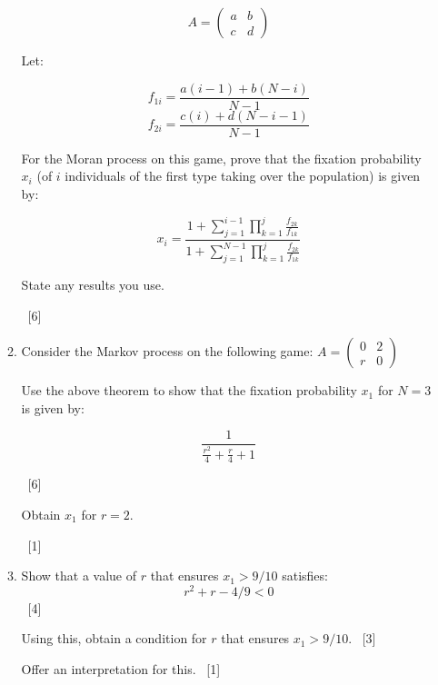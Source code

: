 \documentclass[12pt,a4paper]{article}
\makeatletter
\renewcommand{\@oddfoot}{\hfil \arabic{page} \hfil}    %
\makeatother
\begin{document}
\begin{enumerate}
\begin{enumerate}
			$$ A= \begin{pmatrix} a & b\\ c & d \end{pmatrix} $$

			Let:

			$$f_{1i}=\frac{a(i-1)+b(N-i)}{N-1}$$
$$f_{2i}=\frac{c(i)+d(N-i-1)}{N-1}$$

			For the Moran process on this game, prove that the fixation
probability \(x_i\) (of \(i\) individuals of the first type taking over the
population) is given by:

			$$
x_i=\frac{1+\sum_{j=1}^{i-1}\prod_{k=1}^j\frac{f_{2k}}{f_{1k}}}{1+\sum_{j=1}^{N-1}\prod_{k=1}^j\frac{f_{2k}}{f_{1k}}}
$$

             State any results you use.

            ~\hfill{[6]}
        \item Consider the Markov process on the following game:
        \(A = \begin{pmatrix} 0 & 2\\ r & 0 \end{pmatrix}\)

            Use the above theorem to show that the fixation probability \(x_1\)
            for \(N=3\) is given by:

            \[
                \frac{1}{\frac{r^{2}}{4} + \frac{r}{4} + 1}
            \]

            ~\hfill{[6]}

            Obtain \(x_1\) for \(r=2\).

            ~\hfill{[1]}


        \item Show that a value of \(r\) that ensures \(x_1>9/10\) satisfies:
            \[
                r ^ 2 + r - 4 / 9 < 0
            \]
            ~\hfill{[4]}

            Using this, obtain a condition for \(r\) that ensures
            \(x_1>9/10\).
            ~\hfill{[3]}

            Offer an interpretation for this.
            ~\hfill{[1]}


    \end{enumerate}
\end{enumerate}


\makeatletter
\renewcommand{\@oddfoot}{\hfil \arabic{page}X \hfil}    %
\makeatother
\end{document}
